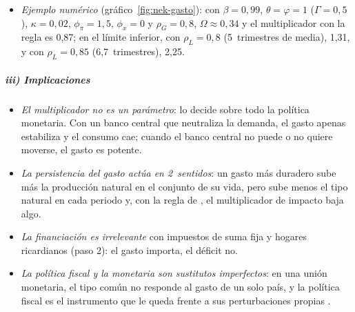 \documentclass[11pt]{article}
\begin{document}
\begin{itemize}
\begin{itemize}
    \begin{equation*}
    (1-\rho_L)\,x_L=\tfrac1\theta\,\rho_L\,\pi_L+(1-\Gamma)(1-\rho_L)\,g_L,\qquad(1-\beta\rho_L)\,\pi_L=\kappa\,x_L;
    \end{equation*}
  \item con $\Omega_L\equiv\rho_L\kappa/[\theta(1-\rho_L)(1-\beta\rho_L)]$ ($\Omega_L$, local), $x_L=(1-\Gamma)\,g_L/(1-\Omega_L)$ y
    \begin{equation}\label{eq:multiplicador-nek-zlb}
    m_L=\Gamma+\frac{1-\Gamma}{1-\Omega_L}>1\quad\text{si}\quad0<\Omega_L<1:
    \end{equation}
    el gasto sube la inflación esperada, el tipo nominal no responde y el tipo real \emph{baja}; el consumo sube. El multiplicador crece sin límite si $\Omega_L$ se acerca a 1 (episodios largos, precios poco rígidos)\nocite{Woodford2011Simple,Eggertsson2011Fiscal}. \findemo
  \end{itemize}
\item \emph{Ejemplo numérico} (gráfico~\ref{fig:nek-gasto}): con $\beta=0{,}99$, $\theta=\varphi=1$ ($\Gamma=0{,}5$), $\kappa=0{,}02$, $\phi_\pi=1{,}5$, $\phi_x=0$ y $\rho_G=0{,}8$, $\Omega\approx0{,}34$ y el multiplicador con la regla es 0,87; en el límite inferior, con $\rho_L=0{,}8$ (5~trimestres de media), 1,31, y con $\rho_L=0{,}85$ (6,7~trimestres), 2,25.
\end{itemize}

\subparagraph{iii) Implicaciones}

\begin{itemize}
\item \emph{El multiplicador no es un parámetro}: lo decide sobre todo la política monetaria. Con un banco central que neutraliza la demanda, el gasto apenas estabiliza y el consumo cae; cuando el banco central no puede o no quiere moverse, el gasto es potente.
\item \emph{La persistencia del gasto actúa en 2~sentidos}: un gasto más duradero sube más la producción natural en el conjunto de su vida, pero sube menos el tipo natural en cada periodo y, con la regla de , el multiplicador de impacto baja algo.
\item \emph{La financiación es irrelevante} con impuestos de suma fija y hogares ricardianos (paso 2): el gasto importa, el déficit no.
\item \emph{La política fiscal y la monetaria son sustitutos imperfectos}: en una unión monetaria, el tipo común no responde al gasto de un solo país, y la política fiscal es el instrumento que le queda frente a sus perturbaciones propias\nocite{GaliMonacelli2008Optimal} .
\end{itemize}
\end{document}
